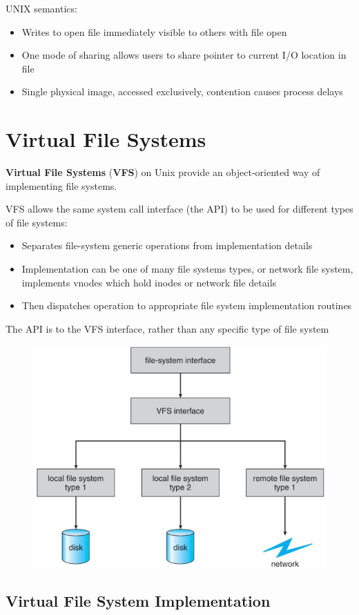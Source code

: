 UNIX semantics:
\begin{itemize}
    \item Writes to open file immediately visible to others with file open
    \item One mode of sharing allows users to share pointer to current I/O location in file
    \item Single physical image, accessed exclusively, contention causes process delays
\end{itemize}


\section{Virtual File Systems}

\textbf{Virtual File Systems} (\textbf{VFS}) on Unix provide an object-oriented way of
implementing file systems.

VFS allows the same system call interface (the API) to be used for
different types of file systems:


\begin{itemize}
    \item Separates file-system generic operations from implementation details
    \item Implementation can be one of many file systems types, or network file system, implements vnodes which hold inodes or network file details
    \item Then dispatches operation to appropriate file system implementation routines
\end{itemize}

The API is to the VFS interface, rather than any specific type of file
system


\begin{figure}[h!]
    \centering
    \includegraphics[width=0.55\linewidth]{img/dfnhbfd.png}
\end{figure}
\newpage
\subsection{Virtual File System Implementation}


